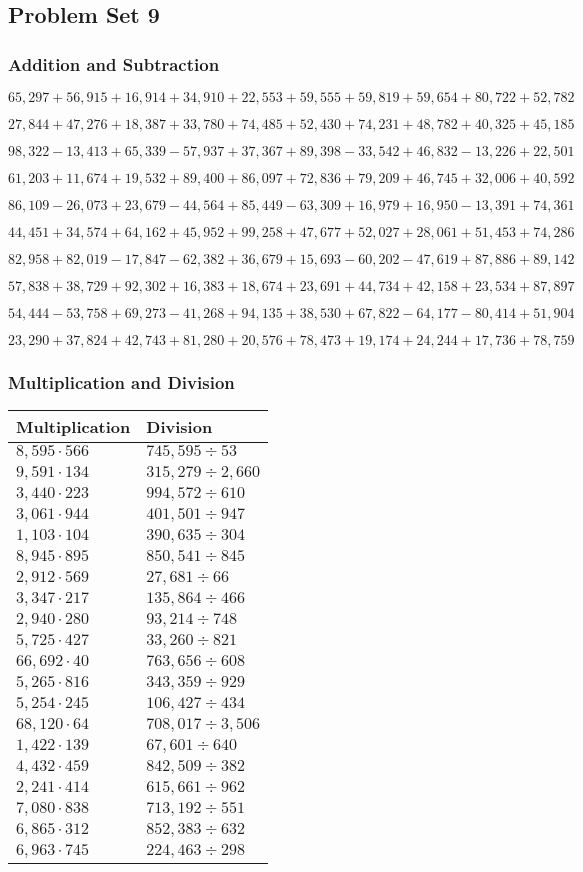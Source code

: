\hypertarget{problem-set-9-4}{%
\subsection{Problem Set 9}\label{problem-set-9-4}}

\hypertarget{addition-and-subtraction-231}{%
\subsubsection{Addition and
Subtraction}\label{addition-and-subtraction-231}}

\(65,297+56,915+16,914+34,910+22,553+59,555+59,819+59,654+80,722+ 52,782\)

\(27,844+47,276+18,387+33,780+74,485+52,430+74,231+48,782+40,325+45,185\)

\(98,322-13,413+65,339-57,937+37,367+89,398-33,542+46,832-13,226+22,501\)

\(61,203+11,674+19,532+89,400+86,097+72,836+79,209+46,745+32,006+40,592\)

\(86,109-26,073+23,679-44,564+85,449-63,309+16,979+16,950-13,391+74,361\)

\(44,451+34,574+64,162+45,952+99,258+47,677+52,027+28,061+51,453+74,286\)

\(82,958+82,019-17,847-62,382+36,679+15,693-60,202-47,619+87,886+89,142\)

\(57,838+38,729+92,302+16,383+18,674+23,691+44,734+42,158+23,534+87,897\)

\(54,444-53,758+69,273-41,268+94,135+38,530+67,822-64,177-80,414+51,904\)

\(23,290+37,824+42,743+81,280+20,576+78,473+19,174+24,244+17,736+78,759\)

\hypertarget{multiplication-and-division-230}{%
\subsubsection{Multiplication and
Division}\label{multiplication-and-division-230}}

\begin{longtable}[]{@{}ll@{}}
\toprule
Multiplication & Division\tabularnewline
\midrule
\endhead
\(8,595\cdot566\) & \(745,595÷53\)\tabularnewline
\(9,591\cdot134\) & \(315,279 ÷2,660\)\tabularnewline
\(3,440\cdot223\) & \(994,572÷610\)\tabularnewline
\(3,061\cdot944\) & \(401,501÷947\)\tabularnewline
\(1,103\cdot104\) & \(390,635÷304\)\tabularnewline
\(8,945\cdot895\) & \(850,541÷845\)\tabularnewline
\(2,912\cdot569\) & \(27,681÷66\)\tabularnewline
\(3,347\cdot217\) & \(135,864÷466\)\tabularnewline
\(2,940\cdot280\) & \(93,214÷748\)\tabularnewline
\(5,725\cdot427\) & \(33,260÷821\)\tabularnewline
\(66,692\cdot40\) & \(763,656÷608\)\tabularnewline
\(5,265\cdot816\) & \(343,359÷929\)\tabularnewline
\(5,254\cdot245\) & \(106,427÷434\)\tabularnewline
\(68,120\cdot64\) & \(708,017÷3,506\)\tabularnewline
\(1,422\cdot139\) & \(67,601÷640\)\tabularnewline
\(4,432\cdot459\) & \(842,509÷382\)\tabularnewline
\(2,241\cdot414\) & \(615,661÷962\)\tabularnewline
\(7,080\cdot838\) & \(713,192÷551\)\tabularnewline
\(6,865\cdot312\) & \(852,383÷632\)\tabularnewline
\(6,963\cdot745\) & \(224,463÷298\)\tabularnewline
\bottomrule
\end{longtable}

